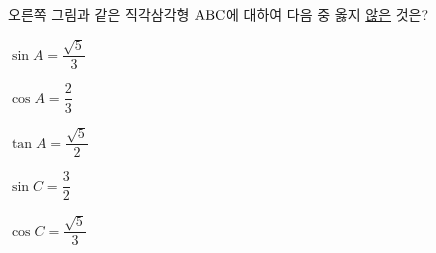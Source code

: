 \noindent\begin{minipage}[t]{0.58\linewidth}\vspace{0pt}\raggedright 오른쪽 그림과 같은 직각삼각형 $\mathrm{ABC}$에 대하여 다음 중 옳지 \underline{않은} 것은?\end{minipage}\hfill\begin{minipage}[t]{0.4\linewidth}\vspace{0pt}\centering \resizebox{\ifdim\width>\linewidth\linewidth\else\width\fi}{!}{}\end{minipage}\par
\begin{choicesv}{\rule[-3ex]{0pt}{8ex}$\sin A=\dfrac{\sqrt{5}}{3}$}{\rule[-3ex]{0pt}{8ex}$\cos A=\dfrac{2}{3}$}{\rule[-3ex]{0pt}{8ex}$\tan A=\dfrac{\sqrt{5}}{2}$}{\rule[-3ex]{0pt}{8ex}$\sin C=\dfrac{3}{2}$}{\rule[-3ex]{0pt}{8ex}$\cos C=\dfrac{\sqrt{5}}{3}$}\end{choicesv}
